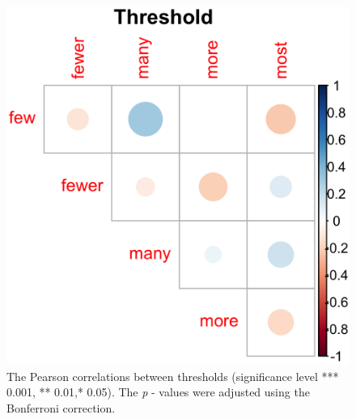 \documentclass{article}
\begin{document}
\begin{figure} [H]
    \centering
   \includegraphics[scale=0.25]{Figure2.3a.png}
    \caption{The Pearson correlations between thresholds (significance level *** 0.001, ** 0.01,*  0.05). The \textit{p} -  values were adjusted using the Bonferroni correction.}
    \label{fig:fig2.3}
\end{figure}
\end{document}
